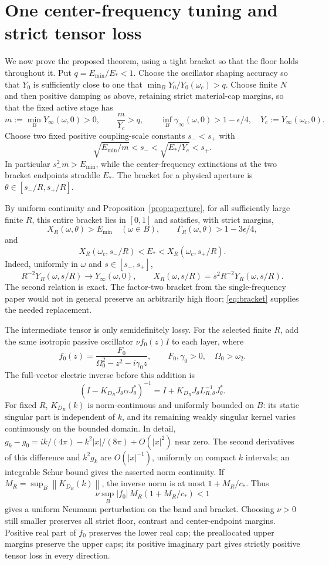 \documentclass[11pt]{article}
\newcommand{\norm}[1]{\left\lVert#1\right\rVert}
\newcommand{\abs}[1]{\left|#1\right|}
\begin{document}
\section{One center-frequency tuning and strict tensor loss}
We now prove the proposed theorem, using a tight bracket so that the floor
holds throughout it. Put $q=E_{\min}/E_*<1$. Choose the oscillator shaping
accuracy so that $Y_0$ is sufficiently close to one that
$\min_B Y_0/Y_0(\omega_c)>q$. Choose finite $N$ and then positive damping as
above, retaining strict material-cap margins, so that the fixed active stage has
\[
 m:=\min_B Y_\infty(\omega,0)>0,\qquad
 \frac{m}{Y_c}>q,\qquad
 \inf_B\gamma_\infty(\omega,0)>1-\epsilon/4,
 \quad Y_c:=Y_\infty(\omega_c,0).
\]
Choose two fixed positive coupling-scale constants $s_-<s_+$ with
\begin{equation}\label{eq:bracket}
 \sqrt{E_{\min}/m}<s_-<\sqrt{E_*/Y_c}<s_+.
\end{equation}
In particular $s_-^2m>E_{\min}$, while the center-frequency extinctions at the
two bracket endpoints straddle $E_*$. The bracket for a physical aperture is
$\theta\in[s_-/R,s_+/R]$.

By uniform continuity and Proposition~\ref{prop:aperture}, for all sufficiently
large finite $R$, this entire bracket lies in $[0,1]$ and satisfies, with
strict margins,
\[
 X_R(\omega,\theta)>E_{\min}\quad(\omega\in B),\qquad
 \Gamma_R(\omega,\theta)>1-3\epsilon/4,
\]
and
\[
 X_R(\omega_c,s_-/R)<E_*<
 X_R(\omega_c,s_+/R).
\]
Indeed, uniformly in $\omega$ and $s\in[s_-,s_+]$,
\[
 R^{-2}Y_R(\omega,s/R)\to Y_\infty(\omega,0),\qquad
 X_R(\omega,s/R)=s^2R^{-2}Y_R(\omega,s/R).
\]
The second relation is exact.
The factor-two bracket from the single-frequency paper would not in general
preserve an arbitrarily high floor; \eqref{eq:bracket} supplies the needed
replacement.

The intermediate tensor is only semidefinitely lossy. For the selected finite
$R$, add the same isotropic passive oscillator $\nu f_0(z)I$ to each layer, where
\[
 f_0(z)=\frac{F_0}{\Omega_0^2-z^2-i\gamma_0z},
 \qquad F_0,\gamma_0>0,\quad\Omega_0>\omega_2.
\]
The full-vector electric inverse before this addition is
\[
 (I-K_{D_R}J_\theta\alpha J_\theta^*)^{-1}
 =I+K_{D_R}J_\theta L_{R,\theta}^{-1}J_\theta^*.
\]
For fixed $R$, $K_{D_R}(k)$ is norm-continuous and uniformly bounded on $B$:
its static singular part is independent of $k$, and its remaining weakly
singular kernel varies continuously on the bounded domain. In detail,
$g_k-g_0=ik/(4\pi)-k^2\abs x/(8\pi)+O(\abs x^2)$ near zero.
The second derivatives of this difference and $k^2g_k$ are $O(\abs x^{-1})$,
uniformly on compact $k$ intervals; an integrable Schur bound gives the asserted
norm continuity. If
$M_R=\sup_B\norm{K_{D_R}(k)}$, the inverse norm is at most $1+M_R/c_*$.
Thus
\[
 \nu\sup_B\abs{f_0}\,M_R(1+M_R/c_*)<1
\]
gives a uniform Neumann perturbation on the band and bracket. Choosing $\nu>0$
still smaller preserves all strict floor, contrast and center-endpoint
margins. Positive real part of $f_0$ preserves the lower real cap; the
preallocated upper margins preserve the upper caps; its positive imaginary
part gives strictly positive tensor loss in every direction.
\end{document}

